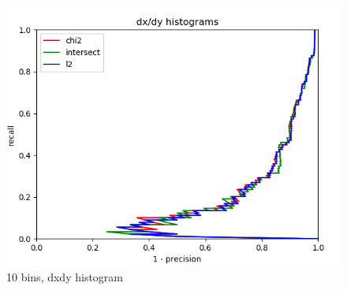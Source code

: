 \documentclass{article}
\begin{document}
\begin{figure}[ht]
\begin{minipage}{.5\textwidth}
        \includegraphics[width=\linewidth]{images/Q4.b-dxdy_histogram_10_bins.png}
        \cprotect\caption{10 bins, dxdy histogram}
    \end{minipage}
\end{figure}
\end{document}
